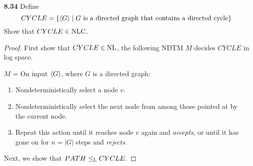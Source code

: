 \label{lang:CYCLE_NLC}
\textbf{8.34} Define
\[
CYCLE = \{\langle{G}\rangle \mid G \text{ is a directed graph that contains a directed cycle} \}
\]
Show that $CYCLE \in \text{NLC}$.
\begin{mdframed}
\begin{proof}
First show that $CYCLE \in \text{NL}$, the following NDTM $M$ decides $CYCLE$ in log space.

\medskip
$M$ = On input $\langle{G}\rangle$, where $G$ is a directed graph:
\begin{enumerate}
\item Nondeterministically select a node $v$.
\item Nondeterministically select the next node from among those pointed at by the current node.
\item Repeat this action until it reaches node $v$ again and \textit{accepts}, or until it has gone on for $n = |G|$ steps and \textit{rejects}.
\end{enumerate}

\medskip
Next, we show that $PATH \leq_{\text{L}} CYCLE$.
\end{proof}
\end{mdframed}


